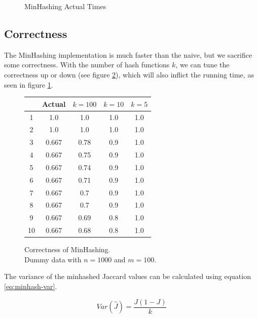 \documentclass[a4paper,11pt]{article}
\begin{document}
\begin{figure}[H]
    \begin{center}
        
        \caption{MinHashing Actual Times}
        \label{fig:minhashing_at}
    \end{center}
\end{figure}

\subsection{Correctness}
The MinHashing implementation is much faster than the naive, but we sacrifice some correctness. With the number of hash functions $k$, we can tune the correctness up or down (see figure \ref{tab:minhash-correctness}), which will also inflict the running time, as seen in figure \ref{fig:minhashing_at}. \\

\begin{figure}[H]
    \begin{center}
        \begin{tabular}{c|c|c|c|c}
              & Actual & $k = 100$ & $k = 10$ & $k = 5$\\
            \hline
            1 & 1.0 & 1.0  & 1.0 & 1.0\\
            2 & 1.0  & 1.0  & 1.0 & 1.0\\
            3 & 0.667 & 0.78 & 0.9 & 1.0\\
            4 & 0.667 & 0.75 & 0.9 & 1.0\\
            5 & 0.667 & 0.74 & 0.9 & 1.0\\
            6 & 0.667 & 0.71 & 0.9 & 1.0\\
            7 & 0.667 & 0.7 & 0.9 & 1.0\\
            8 & 0.667 & 0.7 & 0.9 & 1.0\\
            9 & 0.667 & 0.69 & 0.8 & 1.0\\
            10 & 0.667 & 0.68 & 0.8 & 1.0 
        \end{tabular}
        \caption{Correctness of MinHashing. \\Dummy data with $n = 1000$ and $m = 100$.}
        \label{tab:minhash-correctness}
    \end{center}
\end{figure}

The variance of the minhashed Jaccard values can be calculated using equation \ref{eq:minhash-var}.

\begin{equation}
    Var(\hat{J}) = \frac{J(1-J)}{k}
    \label{eq:minhash-var}
\end{equation}
\end{document}
